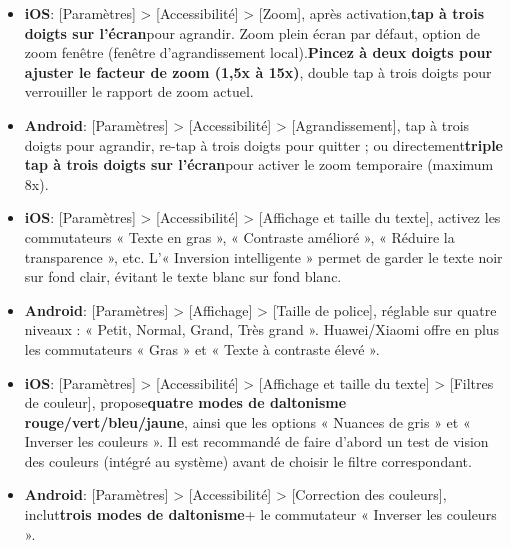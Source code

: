 

\begin{itemize}
  \item \textbf{iOS}: [Paramètres] > [Accessibilité] > [Zoom], après activation,\textbf{tap à trois doigts sur l'écran}pour agrandir. Zoom plein écran par défaut, option de zoom fenêtre (fenêtre d'agrandissement local).\textbf{Pincez à deux doigts pour ajuster le facteur de zoom (1,5x à 15x)}, double tap à trois doigts pour verrouiller le rapport de zoom actuel.
  \item \textbf{Android}: [Paramètres] > [Accessibilité] > [Agrandissement], tap à trois doigts pour agrandir, re-tap à trois doigts pour quitter ; ou directement\textbf{triple tap à trois doigts sur l'écran}pour activer le zoom temporaire (maximum 8x).
\end{itemize}


\begin{itemize}
  \item \textbf{iOS}: [Paramètres] > [Accessibilité] > [Affichage et taille du texte], activez les commutateurs « Texte en gras », « Contraste amélioré », « Réduire la transparence », etc. L'« Inversion intelligente » permet de garder le texte noir sur fond clair, évitant le texte blanc sur fond blanc.
  \item \textbf{Android}: [Paramètres] > [Affichage] > [Taille de police], réglable sur quatre niveaux : « Petit, Normal, Grand, Très grand ». Huawei/Xiaomi offre en plus les commutateurs « Gras » et « Texte à contraste élevé ».
\end{itemize}


\begin{itemize}
  \item \textbf{iOS}: [Paramètres] > [Accessibilité] > [Affichage et taille du texte] > [Filtres de couleur], propose\textbf{quatre modes de daltonisme rouge/vert/bleu/jaune}, ainsi que les options « Nuances de gris » et « Inverser les couleurs ». Il est recommandé de faire d'abord un test de vision des couleurs (intégré au système) avant de choisir le filtre correspondant.
  \item \textbf{Android}: [Paramètres] > [Accessibilité] > [Correction des couleurs], inclut\textbf{trois modes de daltonisme}+ le commutateur « Inverser les couleurs ».
\end{itemize}


